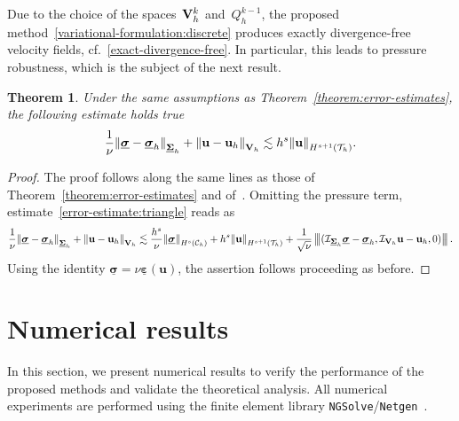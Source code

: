 \documentclass[a4paper,twoside,10pt]{article}
\theoremstyle{plain}
\newtheorem{theorem}{Theorem}[section]
\theoremstyle{remark}
\theoremstyle{definition}
\numberwithin{equation}{section}
\numberwithin{figure}{section}
\newcommand{\Norm}[1]{{\left\|{#1} \right\|}}
\newcommand{\Normthreebars}[3]{\left|\!\left|\!\left| (#1,#2,#3) \right|\!\right|\!\right|}
\newcommand{\Ccalh}{\mathcal{C}_h}
\newcommand{\Tauh}{\mathcal{T}_h}
\newcommand{\Sigmah}{\underline{\boldsymbol{\Sigma}}_h}
\newcommand{\Vh}{{\bf{V}}_h}
\newcommand{\Vhk}{\Vh^k}
\newcommand{\Qh}{Q_h}
\newcommand{\Qhkmo}{\Qh^{k-1}}
\newcommand{\sigmabfh}{\underline{\boldsymbol{\sigma}}_h}
\newcommand{\ubfh}{\mathbf{u}_h}
\newcommand{\sigmabf}{\underline{\boldsymbol{\sigma}}}
\newcommand{\ubf}{\mathbf{u}}
\newcommand{\epsbfun}{\underline{\boldsymbol{\varepsilon}}}
\newcommand{\IcalVhk}{\mathcal{I}_{\Vh}}
\newcommand{\IcalSigmahkmo}{\mathcal{I}_{\Sigmah}}
\begin{document}
Due to the choice of the spaces~$\Vhk$ and~$\Qhkmo$,
the proposed method~\eqref{variational-formulation:discrete}
produces exactly divergence-free velocity fields,
cf.~\eqref{exact-divergence-free}.
In particular,
this leads to pressure robustness,
which is the subject of the next result.
\begin{theorem}
Under the same assumptions as Theorem~\ref{theorem:error-estimates},
the following estimate holds true
\begin{equation*}
\frac{1}{\nu}\Norm{\sigmabf-\sigmabfh}_{\Sigmah}
    + \Norm{\ubf - \ubfh}_{\Vh}
\lesssim
h^s \Norm{\ubf}_{H^{s+1}(\Tauh)}.
\end{equation*}
\end{theorem}
\begin{proof}
The proof follows along the same lines as those of Theorem~\ref{theorem:error-estimates}
and of~\cite[Thm.~6.4]{Gopalakrishnan-Lederer-Schoberl:2020}.
Omitting the pressure term,
estimate~\eqref{error-estimate:triangle} reads as
\begin{equation*}
\frac{1}{\nu}\Norm{\sigmabf-\sigmabfh}_{\Sigmah} + \Norm{\ubf-\ubfh}_{\Vh}
\lesssim
\frac{h^s}{\nu}\Norm{\sigmabf}_{H^s(\Ccalh)}
    + h^s\Norm{\ubf}_{H^{s+1}(\Tauh)}
    + \frac{1}{\sqrt{\nu}}\Normthreebars{\IcalSigmahkmo\sigmabf-\sigmabfh}{\IcalVhk\ubf-\ubfh}{0}.
\end{equation*}
Using the identity $\sigmabf = \nu \epsbfun(\ubf)$,
the assertion follows proceeding as before.
\end{proof}

\section{Numerical results} \label{section:numerics}
In this section, we present numerical results
to verify the performance of the proposed methods
and validate the theoretical analysis.
All numerical experiments are performed using the finite element library
\texttt{NGSolve}/\texttt{Netgen}~\cite{Schoberl:1997,Schoberl:2014}.
\end{document}
